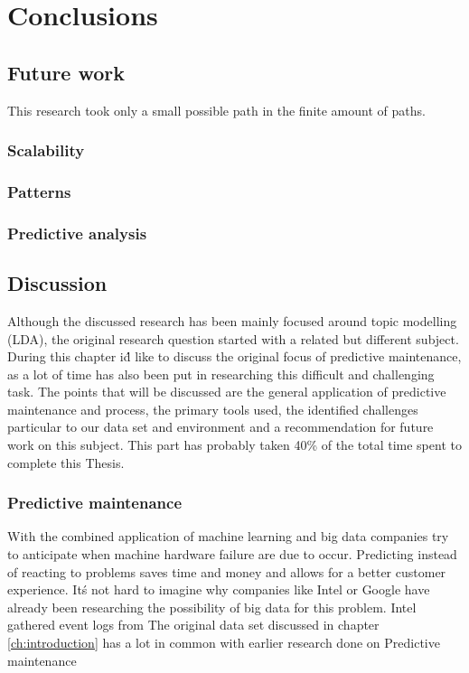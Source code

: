 \chapter{Conclusions} \label{ch:conclusions}

\section {Future work}
This research took only a small possible path in the finite amount of paths. 
\subsection{Scalability}
\subsection{Patterns}
\subsection{Predictive analysis}

\section{Discussion}
Although the discussed research has been mainly focused around topic modelling (LDA), the original research question started with a related but different subject. During this chapter i\'d like to discuss the original focus of predictive maintenance, as a lot of time has also been put in researching this difficult and challenging task. The points that will be discussed are the general application of predictive maintenance and process, the primary tools used, the identified challenges particular to our data set and environment and a recommendation for future work on this subject. This part has probably taken 40\% of the total time spent to complete this Thesis.

\subsection{Predictive maintenance}
With the combined application of machine learning and big data companies try to anticipate when machine hardware failure are due to occur. Predicting instead of reacting to problems saves time and money and allows for a better customer experience. It\'s not hard to imagine why companies like Intel \cite{AjayChandramoulyRavindraNarkhedeVijayMungaraGuillermoRueda2013ReducingAnalytics} or Google have already been researching the possibility of big data for this problem. Intel gathered event logs from 
The original data set discussed in chapter \ref{ch:introduction} has a lot in common with earlier research done on Predictive maintenance \cite{Sipos2014Log-basedMaintenance}

